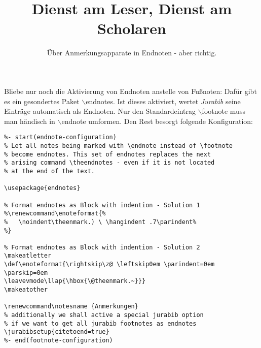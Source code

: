 \documentclass[
  DIV=calc,
  BCOR=5mm,
  11pt,
  smallheadings,
  oneside,
  abstract=true,
  toc=bib,
  english,ngerman]{scrartcl}
\makeatletter
\def\enoteformat{\rightskip\z@ \leftskip0em \parindent=0em \parskip=0em
\leavevmode\llap{\hbox{\@theenmark.~}}}
\renewcommand\notesname{Anmerkungen}
\makeatother
\begin{document}

\titlehead{fodina.csr.howto-: my Classical
Scholar Research framework}
\subject{(Geistes-) Wissenschaftliche Texte mit \textit{jurabib}}
\title{Dienst am Leser, Dienst am Scholaren}
\subtitle{Über Anmerkungsapparate in Endnoten - aber richtig.}

\maketitle



\footnotesize
\tableofcontents
\normalsize







Bliebe nur noch die Aktivierung von Endnoten anstelle von Fußnoten: Dafür gibt es
ein gesondertes Paket $\backslash$endnotes. Ist dieses aktiviert, wertet
\emph{Jurabib} seine Einträge automatisch als Endnoten. Nur den Standardeintrag
$\backslash$footnote muss man händisch in $\backslash$endnote umformen. Den Rest
besorgt folgende Konfiguration:
\small
\begin{verbatim}
%- start(endnote-configuration)
% Let all notes being marked with \endnote instead of \footnote
% become endnotes. This set of endnotes replaces the next 
% arising command \theendnotes - even if it is not located
% at the end of the text.

\usepackage{endnotes}

% Format endnotes as Block with indention - Solution 1
%\renewcommand\enoteformat{%
%   \noindent\theenmark.) \ \hangindent .7\parindent%
%}

% Format endnotes as Block with indention - Solution 2
\makeatletter
\def\enoteformat{\rightskip\z@ \leftskip0em \parindent=0em \parskip=0em
\leavevmode\llap{\hbox{\@theenmark.~}}}
\makeatother

\renewcommand\notesname {Anmerkungen}
% additionally we shall active a special jurabib option
% if we want to get all jurabib footnotes as endnotes
\jurabibsetup{citetoend=true}
%- end(footnote-configuration)

\end{verbatim}
\normalsize





\small



\printnomenclature

\theendnotes

\end{document}
